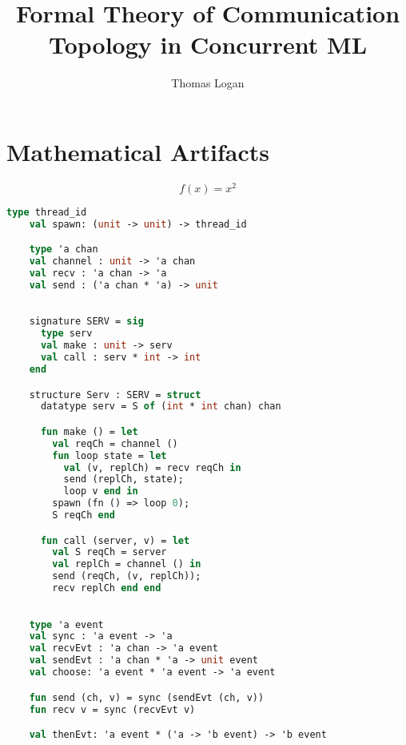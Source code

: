 \documentclass{article}
\title{Formal Theory of Communication Topology in Concurrent ML}
\author{Thomas Logan}
\begin{document}
  \maketitle

  \newpage

  \section{Mathematical Artifacts}

  \begin{equation*}
    f(x) = x^2
    \end{equation*}

  \begin{lstlisting}[language=ML, style=codestyle1]
    type thread_id
    val spawn: (unit -> unit) -> thread_id

    type 'a chan
    val channel : unit -> 'a chan
    val recv : 'a chan -> 'a
    val send : ('a chan * 'a) -> unit
    \end{lstlisting}

  \begin{lstlisting}[language=ML, style=codestyle1]

    signature SERV = sig 
      type serv
      val make : unit -> serv
      val call : serv * int -> int
    end

    structure Serv : SERV = struct 
      datatype serv = S of (int * int chan) chan 

      fun make () = let 
        val reqCh = channel ()
        fun loop state = let
          val (v, replCh) = recv reqCh in 
          send (replCh, state);
          loop v end in
        spawn (fn () => loop 0);
        S reqCh end 

      fun call (server, v) = let 
        val S reqCh = server
        val replCh = channel () in 
        send (reqCh, (v, replCh));
        recv replCh end end

    \end{lstlisting}

  \begin{lstlisting}[language=ML, style=codestyle1]

    type 'a event
    val sync : 'a event -> 'a
    val recvEvt : 'a chan -> 'a event
    val sendEvt : 'a chan * 'a -> unit event
    val choose: 'a event * 'a event -> 'a event

    fun send (ch, v) = sync (sendEvt (ch, v))
    fun recv v = sync (recvEvt v)

    val thenEvt: 'a event * ('a -> 'b event) -> 'b event

    \end{lstlisting}
\end{document}
